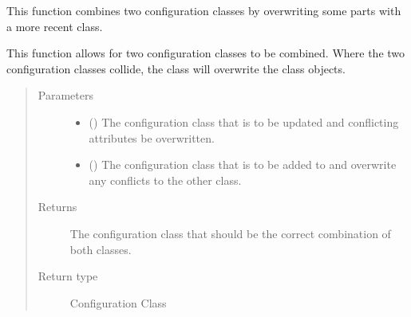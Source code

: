 \documentclass[letterpaper,10pt,english]{sphinxmanual}
\begin{document}
\begin{fulllineitems}
\label{\detokenize{python_docstrings/IfA_Smeargle.yankee.yankee_functions:IfA_Smeargle.yankee.yankee_functions.overwrite_configuration_class}}
This function combines two configuration classes by overwriting some
parts with a more recent class.

This function allows for two configuration classes to be combined. Where
the two configuration classes collide, the  class will
overwrite the  class objects.
\begin{quote}\begin{description}
\item[{Parameters}] \leavevmode\begin{itemize}
\item {} 
 () \textendash{} The configuration class that is to be updated and conflicting
attributes be overwritten.

\item {} 
 () \textendash{} The configuration class that is to be added to and overwrite any
conflicts to the other class.

\end{itemize}

\item[{Returns}] \leavevmode
{} \textendash{} The configuration class that should be the correct combination of
both classes.

\item[{Return type}] \leavevmode
Configuration Class

\end{description}\end{quote}

\end{fulllineitems}

\end{document}
